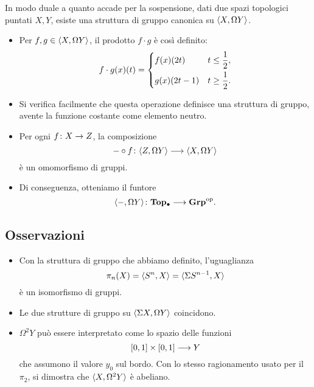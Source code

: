 \begin{frame*}
In modo duale a quanto accade per la sospensione, dati due spazi topologici puntati $X,Y$, esiste una struttura di gruppo canonica su $\langle X,\Omega Y\rangle$.
\begin{itemize}
\item Per $f,g\in\langle X,\Omega Y\rangle$, il prodotto $f\cdot g$ è così definito:
\[
f\cdot g(x)(t)=\begin{dcases}f(x)(2t)&t\le\frac{1}{2},\\g(x)(2t-1)&t\ge\frac{1}{2}.\end{dcases}
\]
\item Si verifica facilmente che questa operazione definisce una struttura di gruppo, avente la funzione costante come elemento neutro.
\item Per ogni $\map{f}{X}{Z}$, la composizione
\[
\map{-\circ f}{\hmaps{Z,\Omega Y}}{\hmaps{X,\Omega Y}}
\]
 è un omomorfismo di gruppi.
 \item Di conseguenza, otteniamo il funtore
 \[
 \map{\hmaps{-,\Omega Y}}{\Top0}{\Grp^{\text{op}}}.
 \]
\end{itemize}
\end{frame*}

\subsection*{Osservazioni}
\begin{frame*}
\begin{itemize}
\item Con la struttura di gruppo che abbiamo definito, l'uguaglianza
\[
\pi_n(X)=\langle S^n,X\rangle=\langle \Sigma S^{n-1},X\rangle
\]
è un isomorfismo di gruppi.
\item Le due strutture di gruppo su  $\langle \Sigma X,\Omega Y\rangle$ coincidono.
\item $\Omega^2Y$ può essere interpretato come lo spazio delle funzioni
\[
\umap{[0,1]\times[0,1]}{Y}
\]
che assumono il valore $y_0$ sul bordo. Con lo stesso ragionamento usato per il $\pi_2$, si dimostra che $\langle X,\Omega^2Y\rangle$ è abeliano.
\end{itemize}
\end{frame*}

